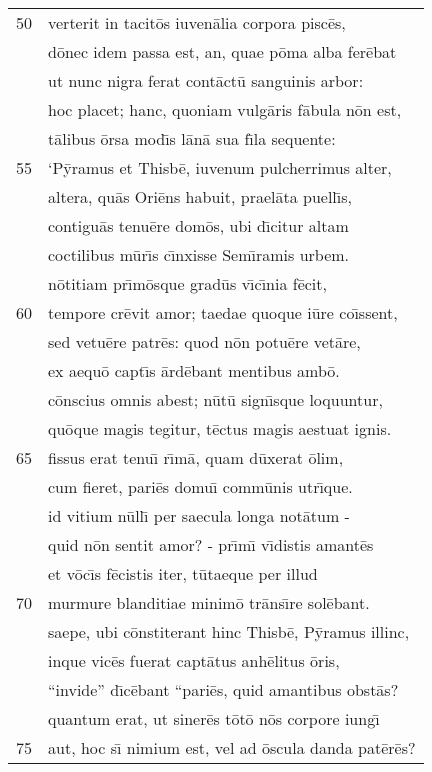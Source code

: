 \documentclass[paper=6in:9in,pagesize=pdftex,
               headinclude=on,footinclude=on,12pt]{scrbook}
\begin{document}
\begin{longtable}[p]{ r l }
50 & verterit in tacit\=os iuven\=alia corpora pisc\=es,\\ 
 & d\=onec idem passa est, an, quae p\=oma alba fer\=ebat\\ 
 & ut nunc nigra ferat cont\=act\=u sanguinis arbor:\\ 
 & hoc placet; hanc, quoniam vulg\=aris f\=abula n\=on est,\\ 
 & t\=alibus \=orsa mod\={\i}s l\=an\=a sua f\={\i}la sequente:\\ 
55 & \indent `P\=yramus et Thisb\=e, iuvenum pulcherrimus alter,\\ 
 & altera, qu\=as Ori\=ens habuit, prael\=ata puell\={\i}s,\\ 
 & contigu\=as tenu\=ere dom\=os, ubi d\={\i}citur altam\\ 
 & coctilibus m\=ur\={\i}s c\={\i}nxisse Sem\={\i}ramis urbem.\\ 
 & n\=otitiam pr\={\i}m\=osque grad\=us v\={\i}c\={\i}nia f\=ecit,\\ 
60 & tempore cr\=evit amor; taedae quoque i\=ure co\={\i}ssent,\\ 
 & sed vetu\=ere patr\=es: quod n\=on potu\=ere vet\=are,\\ 
 & ex aequ\=o capt\={\i}s \=ard\=ebant mentibus amb\=o.\\ 
 & c\=onscius omnis abest; n\=ut\=u sign\={\i}sque loquuntur,\\ 
 & qu\=oque magis tegitur, t\=ectus magis aestuat ignis.\\ 
65 & fissus erat tenu\={\i} r\={\i}m\=a, quam d\=uxerat \=olim,\\ 
 & cum fieret, pari\=es domu\={\i} comm\=unis utr\={\i}que.\\ 
 & id vitium n\=ull\={\i} per saecula longa not\=atum -\\ 
 & quid n\=on sentit amor? - pr\={\i}m\={\i} v\={\i}distis amant\=es\\ 
 & et v\=oc\={\i}s f\=ecistis iter, t\=utaeque per illud\\ 
70 & murmure blanditiae minim\=o tr\=ans\={\i}re sol\=ebant.\\ 
 & saepe, ubi c\=onstiterant hinc Thisb\=e, P\=yramus illinc,\\ 
 & inque vic\=es fuerat capt\=atus anh\=elitus \=oris,\\ 
 & ``invide'' d\={\i}c\=ebant ``pari\=es, quid amantibus obst\=as?\\ 
 & quantum erat, ut siner\=es t\=ot\=o n\=os corpore iung\={\i}\\ 
75 & aut, hoc s\={\i} nimium est, vel ad \=oscula danda pat\=er\=es?\\ 

\end{longtable}
\end{document}
